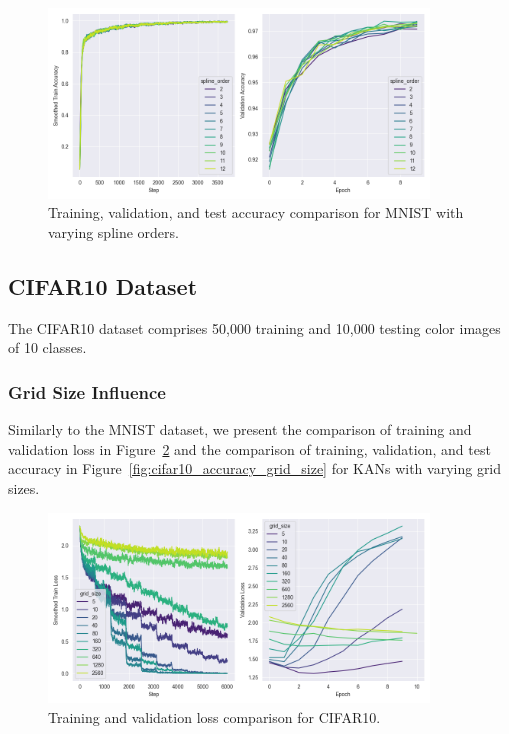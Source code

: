 \documentclass{article}
\begin{document}
\begin{figure}[H]
    \centering
    \includegraphics[width=0.9\textwidth]{pics/mnist_accuracy_spline_order}
    \caption{Training, validation, and test accuracy comparison for MNIST with varying spline orders.}
    \label{fig:mnist_accuracy_spline_order}
\end{figure}


\subsection{CIFAR10 Dataset}\label{subsec:cifar10}

The CIFAR10 dataset comprises 50,000 training and 10,000 testing color images of 10 classes.

\subsubsection{Grid Size Influence}\label{subsubsec:grid-size-influence-cifar10}

Similarly to the MNIST dataset, we present the comparison of training and validation loss in Figure~\ref{fig:cifar10_loss_grid_size}
and the comparison of training, validation, and test accuracy in Figure~\ref{fig:cifar10_accuracy_grid_size} for KANs with varying grid sizes.

\begin{figure}[H]
    \centering
    \includegraphics[width=0.9\textwidth]{pics/cifar10_loss_grid_size}
    \caption{Training and validation loss comparison for CIFAR10.}
    \label{fig:cifar10_loss_grid_size}
\end{figure}
\end{document}

